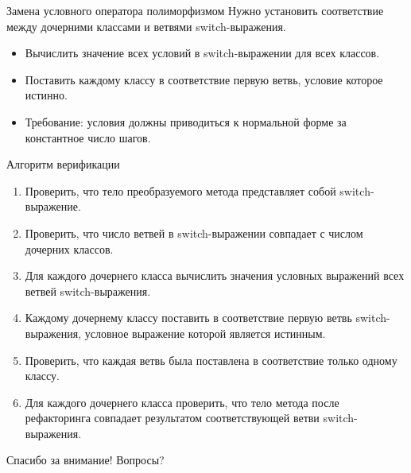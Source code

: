 \documentclass[hyperref=unicode,graphics=pdflatex,13pt]{beamer}
\begin{document}
\begin{frame}{Замена условного оператора полиморфизмом}
Нужно установить соответствие между дочерними классами и ветвями switch-выражения.
\begin{itemize}
    \item Вычислить значение всех условий в switch-выражении для всех классов.
    \item Поставить каждому классу в соответствие первую ветвь, условие которое истинно.
    \item Требование: условия должны приводиться к нормальной форме за константное число шагов.
\end{itemize}
\end{frame}

\begin{frame}{Алгоритм верификации}
\begin{enumerate}
    \item Проверить, что тело преобразуемого метода представляет собой switch-выражение.
    \item Проверить, что число ветвей в switch-выражении совпадает с числом дочерних классов.
    \item Для каждого дочернего класса вычислить значения условных выражений всех ветвей switch-выражения.
    \item Каждому дочернему классу поставить в соответствие первую ветвь switch-выражения, условное выражение которой является истинным.
    \item Проверить, что каждая ветвь была поставлена в соответствие только одному классу.
    \item Для каждого дочернего класса проверить, что тело метода после рефакторинга совпадает результатом соответствующей ветви switch-выражения.
\end{enumerate}
\end{frame}


\begin{frame}{Спасибо за внимание! Вопросы?}
\end{frame}
\end{document}
